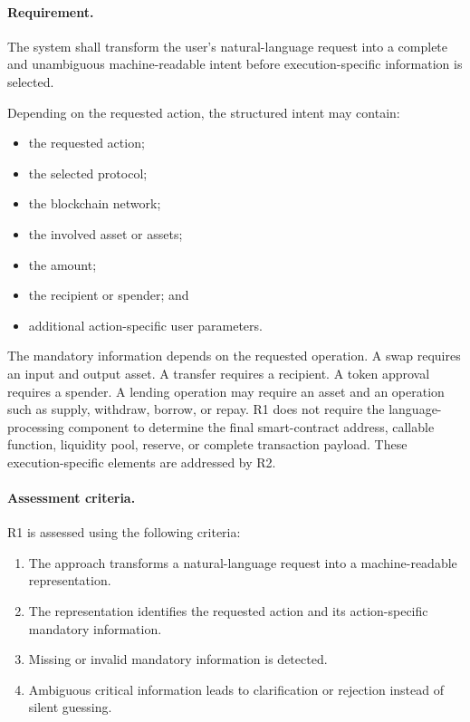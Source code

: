 \paragraph{Requirement.}

The system shall transform the user's natural-language request into a complete
and unambiguous machine-readable intent before execution-specific information
is selected.

Depending on the requested action, the structured intent may contain:

\begin{itemize}
    \item the requested action;
    \item the selected protocol;
    \item the blockchain network;
    \item the involved asset or assets;
    \item the amount;
    \item the recipient or spender; and
    \item additional action-specific user parameters.
\end{itemize}

The mandatory information depends on the requested operation. A swap requires
an input and output asset. A transfer requires a recipient. A token approval
requires a spender. A lending operation may require an asset and an operation
such as supply, withdraw, borrow, or repay. R1 does not require the language-processing component to determine the final
smart-contract address, callable function, liquidity pool, reserve, or complete
transaction payload. These execution-specific elements are addressed by R2.

\paragraph{Assessment criteria.}

R1 is assessed using the following criteria:

\begin{enumerate}
    \item[\textbf{C1}] The approach transforms a natural-language request
    into a machine-readable representation.

    \item[\textbf{C2}] The representation identifies the requested action
    and its action-specific mandatory information.

    \item[\textbf{C3}] Missing or invalid mandatory information is detected.

    \item[\textbf{C4}] Ambiguous critical information leads to clarification
    or rejection instead of silent guessing.
\end{enumerate}


